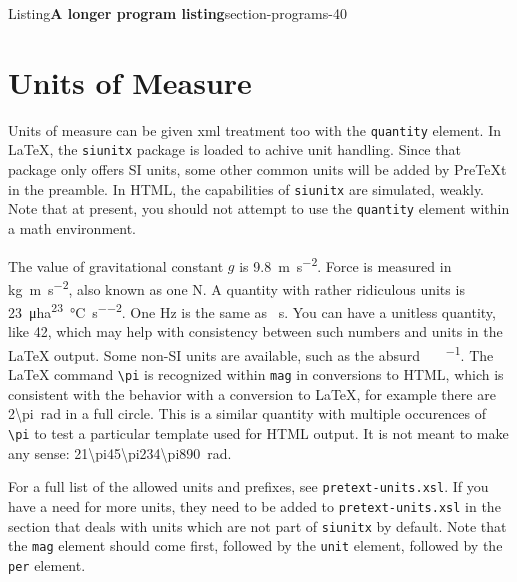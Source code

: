 \documentclass[pdflatex]{sn-jnl}
\theoremstyle{thmstyleone}%
\theoremstyle{thmstyletwo}%
\theoremstyle{thmstylethree}%
\newcommand{\mono}[1]{\texttt{#1}}
\numberwithin{equation}{section}
\begin{document}
\begin{listingptx}{Listing}{\textbf{A longer program listing}}{section-programs-40}{}
\end{listingptx}%
%
%
\typeout{************************************************}
\typeout{************************************************}
%
\section{Units of Measure}\label{section-units-measure}%
Units of measure can be given xml treatment too with the \mono{quantity} element. In \LaTeX{}, the \mono{siunitx} package is loaded to achive unit handling. Since that package only offers SI units, some other common units will be added by PreTeXt in the preamble. In HTML, the capabilities of \mono{siunitx} are simulated, weakly. Note that at present, you should not attempt to use the \mono{quantity} element within a math environment.%
\par
The value of gravitational constant \(g\) is \SI{9.8}{\meter\per\second\tothe{2}}. Force is measured in \si{\kilo\gram\meter\per\second\tothe{2}}, also known as one \si{\newton}. A quantity with rather ridiculous units is \SI{23}{\micro\hectare\tothe{23}\per\degreeCelsius\per\second\tothe{2}}. One \si{\hertz} is the same as \si{\per\second}. You can have a unitless quantity, like \num{42}, which may help with consistency between such numbers and units in the \LaTeX{} output. Some non-SI units are available, such as the absurd \si{\degreeFahrenheit\foot\pound\per\gallon}.  The \LaTeX{} command \mono{\textbackslash{}pi} is recognized within \mono{mag} in conversions to HTML, which is consistent with the behavior with a conversion to \LaTeX{}, for example there are \SI{2\pi}{\radian} in a full circle.  This is a similar quantity with multiple occurences of \mono{\textbackslash{}pi} to test a particular template used for HTML output.  It is not meant to make any sense: \SI{21\pi45\pi234\pi890}{\radian}.%
\par
For a full list of the allowed units and prefixes, see \mono{pretext-units.xsl}. If you have a need for more units, they need to be added to \mono{pretext-units.xsl} in the section that deals with units which are not part of \mono{siunitx} by default.  Note that the \mono{mag} element should come first, followed by the \mono{unit} element, followed by the \mono{per} element.%
%
%
\typeout{************************************************}
\typeout{************************************************}
%
\end{document}
